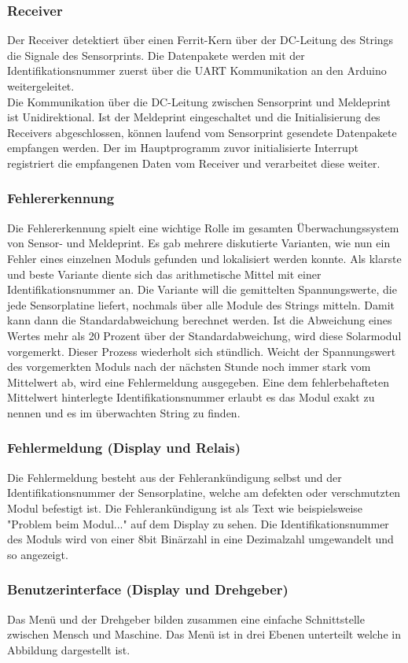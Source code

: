 \subsubsection{Receiver}
Der Receiver detektiert über einen Ferrit-Kern über der DC-Leitung des Strings die Signale des Sensorprints. Die Datenpakete werden mit der Identifikationsnummer zuerst über die UART Kommunikation an den Arduino weitergeleitet.\\
Die Kommunikation über die DC-Leitung zwischen Sensorprint und Meldeprint ist Unidirektional. Ist der Meldeprint eingeschaltet und die Initialisierung des Receivers abgeschlossen, können laufend vom Sensorprint gesendete Datenpakete empfangen werden. Der im Hauptprogramm zuvor initialisierte Interrupt registriert die empfangenen Daten vom Receiver und verarbeitet diese weiter.
\subsubsection{Fehlererkennung}
Die Fehlererkennung spielt eine wichtige Rolle im gesamten Überwachungssystem von Sensor- und Meldeprint. Es gab mehrere diskutierte Varianten, wie nun ein Fehler eines einzelnen Moduls gefunden und lokalisiert werden konnte. Als klarste und beste Variante diente sich das arithmetische Mittel mit einer Identifikationsnummer an. Die Variante will die gemittelten Spannungswerte, die jede Sensorplatine liefert, nochmals über alle Module des Strings mitteln. Damit kann dann die Standardabweichung berechnet werden. Ist die Abweichung eines Wertes mehr als 20 Prozent über der Standardabweichung, wird diese Solarmodul vorgemerkt. Dieser Prozess  wiederholt sich stündlich. Weicht der Spannungswert des vorgemerkten Moduls nach der nächsten Stunde noch immer stark vom Mittelwert ab, wird eine Fehlermeldung ausgegeben. Eine dem fehlerbehafteten Mittelwert hinterlegte Identifikationsnummer erlaubt es das Modul exakt zu nennen und es im überwachten String zu finden.
\subsubsection{Fehlermeldung (Display und Relais)}
Die Fehlermeldung besteht aus der Fehlerankündigung selbst und der Identifikationsnummer der Sensorplatine, welche am defekten oder verschmutzten Modul befestigt ist. Die Fehlerankündigung ist als Text wie beispielsweise "Problem beim Modul..." auf dem Display zu sehen. Die Identifikationsnummer des Moduls wird von einer 8bit Binärzahl in eine Dezimalzahl umgewandelt und so angezeigt.
\subsubsection{Benutzerinterface (Display und Drehgeber)}
Das Menü und der Drehgeber bilden zusammen eine einfache Schnittstelle zwischen Mensch und Maschine. Das Menü ist in drei Ebenen unterteilt welche in Abbildung  dargestellt ist.